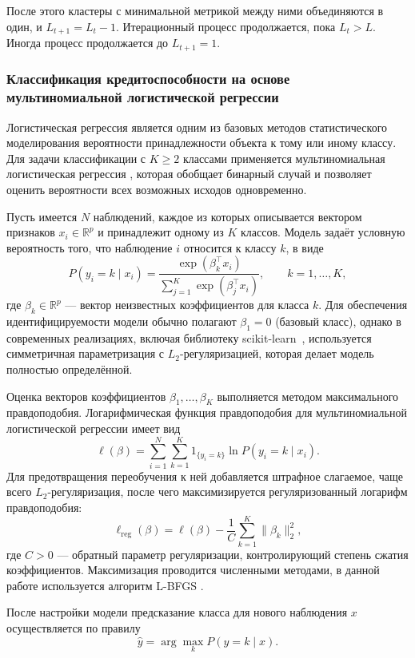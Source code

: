 \documentclass[14pt,a4paper]{extarticle}
\begin{document}
После этого кластеры с минимальной метрикой между ними объединяются в один, и $L_{t+1} = L_{t} - 1$. Итерационный процесс продолжается, пока $L_{t} > L$. Иногда процесс продолжается до $L_{t+1} = 1$.

\subsubsection{Классификация кредитоспособности на основе мультиномиальной 
    логистической регрессии}

Логистическая регрессия является одним из базовых методов статистического моделирования вероятности 
принадлежности объекта к тому или иному классу. Для задачи классификации с \( K \geq 2 \) классами 
применяется мультиномиальная логистическая регрессия \cite{hosmer2013}, которая обобщает бинарный случай и 
позволяет оценить вероятности всех возможных исходов одновременно.

Пусть имеется \( N \) наблюдений, каждое из которых описывается вектором признаков \( x_i \in 
\mathbb{R}^p \) и принадлежит одному из \( K \) классов. Модель задаёт условную вероятность того, что 
наблюдение \( i \) относится к классу \( k \), в виде
\[
P(y_i = k \mid x_i) = \frac{\exp(\beta_k^\top x_i)}{\sum_{j=1}^{K} 
\exp(\beta_j^\top x_i)},
\qquad k = 1, \dots, K,
\]
где \( \beta_k \in \mathbb{R}^p \) — вектор неизвестных коэффициентов для класса \( k \). Для 
обеспечения идентифицируемости модели обычно полагают \(\beta_1 = 0 \) (базовый класс), 
однако в современных реализациях, включая библиотеку scikit-learn~\cite{pedregosa2011}, используется 
симметричная параметризация с \( L_2 \)-регуляризацией, которая делает модель полностью определённой.

Оценка векторов коэффициентов \( \beta_1, \dots, \beta_K \) выполняется методом 
максимального правдоподобия. Логарифмическая функция правдоподобия для мультиномиальной логистической регрессии 
имеет вид
\[
\ell(\beta) = \sum_{i=1}^{N} \sum_{k=1}^{K} 1_{\{y_i = k\}} \ln P(y_i = k \mid 
x_i).
\]
Для предотвращения переобучения к ней добавляется штрафное слагаемое, чаще всего \( L_2 \)-регуляризация, 
после чего максимизируется регуляризованный логарифм правдоподобия:
\[
\ell_{\text{reg}}(\beta) = \ell(\beta) - \frac{1}{C} \sum_{k=1}^{K} \|\beta_k\|_2^2,
\]
где \( C > 0 \) — обратный параметр регуляризации, контролирующий степень сжатия коэффициентов. Максимизация 
проводится численными методами, в данной работе используется алгоритм L-BFGS \cite{liu1989}.

После настройки модели предсказание класса для нового наблюдения \( x \) осуществляется по правилу
\[
\hat{y} = \arg\max_{k} P(y = k \mid x).
\]
\end{document}
